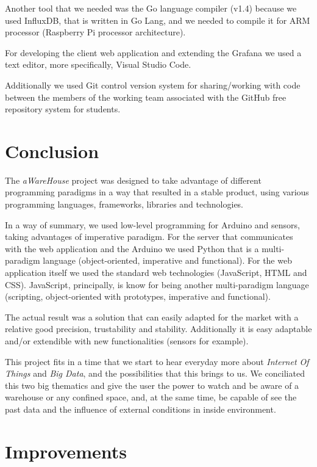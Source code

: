 \documentclass[12pt]{report}
\begin{document}
Another tool that we needed was the Go language compiler (v1.4) because we used InfluxDB, that is written in Go Lang\cite{goinflux}, and we needed to compile it for ARM processor (Raspberry Pi processor architecture).

For developing the client web application and extending the Grafana we used a text editor, more specifically, Visual Studio Code.

Additionally we used Git control version system for sharing/working with code between the members of the working team associated with the GitHub free repository system for students.

\newpage
\chapter{Conclusion}

The \textit{aWareHouse} project was designed to take advantage of different programming paradigms in a way that resulted in a stable product, using various programming languages, frameworks, libraries and technologies. 

In a way of summary, we used low-level programming for Arduino and sensors, taking advantages of imperative paradigm. For the server that communicates with the web application and the Arduino we used Python that is a multi-paradigm language (object-oriented, imperative and functional). For the web application itself we used the standard web technologies (JavaScript, HTML and CSS). JavaScript, principally, is know for being another multi-paradigm language (scripting, object-oriented with prototypes, imperative and functional).

The actual result was a solution that can easily adapted for the market with a relative good precision, trustability and stability. Additionally it is easy adaptable and/or extendible with new functionalities (sensors for example).

This project fits in a time that we start to hear everyday more about \textit{Internet Of Things} and \textit{Big Data}, and the possibilities that this brings to us. We conciliated this two big thematics and give the user the power to watch and be aware of a warehouse or any confined space, and, at the same time, be capable of see the past data and the influence of external conditions in inside environment.

\newpage
\chapter{Improvements}
\end{document}
